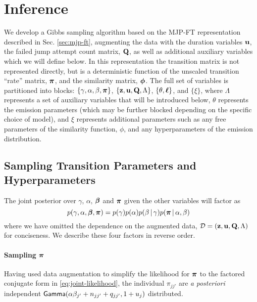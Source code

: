 \section{Inference}
\label{sec:inference}

We develop a Gibbs sampling algorithm based on the MJP-FT
representation described in Sec. \ref{sec:mjp-ft}, augmenting the data with the duration
variables $\mathbf{u}$, the failed jump attempt count matrix, $\mathbf{Q}$, as well
as additional auxiliary variables which we will define below.
In this representation the transition matrix is not represented
directly, but is a deterministic function of the unscaled transition
``rate'' matrix, $\boldsymbol{\pi}$, and the similarity matrix, $\boldsymbol{\phi}$.  
The full set of variables is partitioned into blocks: $\{\gamma, \alpha, \beta, \boldsymbol{\pi}\}$,
$\{\mathbf{z}, \mathbf{u}, \mathbf{Q}, \Lambda\}$, $\{\theta, \boldsymbol{\ell}\}$, and $\{\xi\}$, where $\Lambda$
represents a set of auxiliary variables that will be introduced
below, $\theta$ represents the emission
parameters (which may be further blocked depending on the specific
choice of model), and $\xi$ represents additional
parameters such as any free parameters of the similarity function,
$\phi$, and any hyperparameters of the emission distribution.

\subsection{Sampling Transition Parameters and Hyperparameters}

The joint posterior over $\gamma$, $\alpha$, $\boldsymbol{\beta}$ and $\boldsymbol{\pi}$
given the other variables will factor as
\begin{equation}
  \label{eq:46}
  p(\gamma, \alpha, \boldsymbol{\beta}, \boldsymbol{\pi}) = p(\gamma) p(\alpha) p(\beta \, \vert \, \gamma) p(\boldsymbol{\pi}
  \, \vert \, \alpha, \beta)
\end{equation}
where we have omitted the dependence on the augmented data,
$\mathcal{D} = (\mathbf{z}, \mathbf{u}, \mathbf{Q}, \Lambda)$ for conciseness.  
We describe these four factors in reverse order.

\paragraph{Sampling \texorpdfstring{$\boldsymbol{\pi}$}{pi}} 
Having used data augmentation to simplify the likelihood for $\boldsymbol{\pi}$ to
the factored conjugate form in \eqref{eq:joint-likelihood}, the individual
$\pi_{jj'}$ are {\it a posteriori} independent $\mathsf{Gamma}(\alpha\beta_{j'} + n_{jj'} + q_{jj'},1 + u_j)$ distributed.

